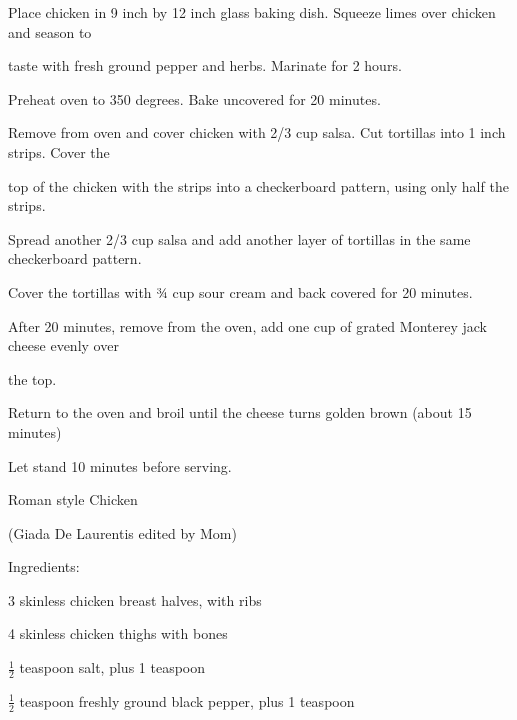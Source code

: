 \documentclass[a4paper,portrait,12pt]{book}
\begin{document}
Place chicken in 9 inch by 12 inch glass baking dish. Squeeze limes over chicken and season to




taste with fresh ground pepper and herbs. Marinate for 2 hours.




Preheat oven to 350 degrees. Bake uncovered for 20 minutes.




Remove from oven and cover chicken with 2/3 cup salsa. Cut tortillas into 1 inch strips. Cover the




top of the chicken with the strips into a checkerboard pattern, using only half the strips.




Spread another 2/3 cup salsa and add another layer of tortillas in the same checkerboard pattern.




Cover the tortillas with ¾ cup sour cream and back covered for 20 minutes.




After 20 minutes, remove from the oven, add one cup of grated Monterey jack cheese evenly over




the top.




Return to the oven and broil until the cheese turns golden brown (about 15 minutes)




Let stand 10 minutes before serving.







\newpage
Roman style Chicken




(Giada De Laurentis edited by Mom)




Ingredients:




3 skinless chicken breast halves, with ribs




4 skinless chicken thighs with bones




$\frac{1}{2}$ teaspoon salt, plus 1 teaspoon




$\frac{1}{2}$ teaspoon freshly ground black pepper, plus 1 teaspoon
\end{document}
